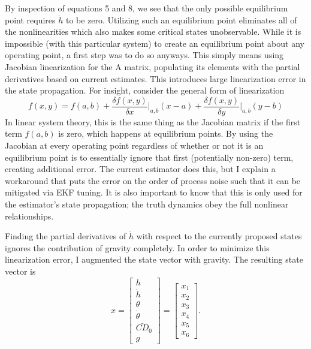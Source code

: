 \documentclass{article}
\begin{document}
  By inspection of equations 5 and 8, we see that the only possible equilibrium point requires $\dot{h}$ to be zero. Utilizing such an equilibrium point eliminates all of the nonlinearities which also makes some critical states unobservable. While it is impossible (with this particular system) to create an equilibrium point about any operating point, a first step was to do so anyways. This simply means using Jacobian linearization for the A matrix, populating its elements with the partial derivatives based on current estimates. This introduces large linearization error in the state propagation. For insight, consider the general form of linearization
  \begin{equation}
    f(x,y) = f(a,b) + \frac{\delta f(x,y)}{\delta x} \bigg\rvert_{a,b} (x-a) + \frac{\delta f(x,y)}{\delta y} \bigg\rvert_{a,b} (y-b)
  \end{equation}
  In linear system theory, this is the same thing as the Jacobian matrix if the first term $f(a,b)$ is zero, which happens at equilibrium points. By using the Jacobian at every operating point regardless of whether or not it is an equilibrium point is to essentially ignore that first (potentially non-zero) term, creating additional error. The current estimator does this, but I explain a workaround that puts the error on the order of process noise such that it can be mitigated via EKF tuning. It is also important to know that this is only used for the estimator's state propagation; the truth dynamics obey the full nonlinear relationships.

  Finding the partial derivatives of $\ddot{h}$ with respect to the currently proposed states ignores the contribution of gravity completely. In order to minimize this linearization error, I augmented the state vector with gravity. The resulting state vector is
  \begin{equation}
    x = \left[\begin{matrix} h \\
                             \dot{h} \\
                             \theta \\
                             \dot{\theta} \\
                             \bar{CD}_0 \\
                             g          \end{matrix}\right]
      = \left[\begin{matrix} x_1 \\
                             x_2 \\
                             x_3 \\
                             x_4 \\
                             x_5 \\
                             x_6        \end{matrix}\right].
  \end{equation}
\end{document}
